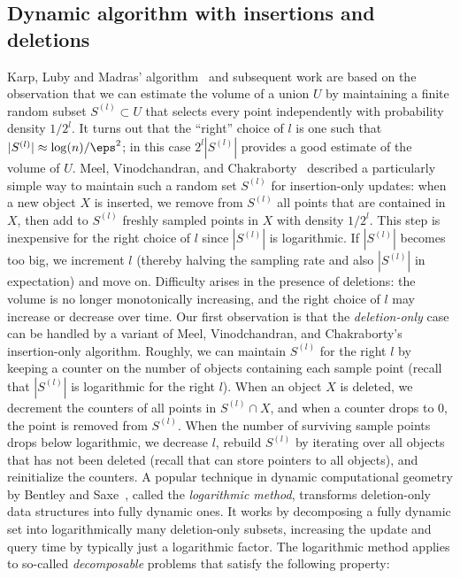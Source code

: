 \subsection{Dynamic algorithm with insertions and deletions}
Karp, Luby and Madras' algorithm~\cite{KarpLM89} and subsequent work are based on the observation that we can estimate the volume of a union $U$ by maintaining a finite random subset $S^{(l)} \subset U$ that selects every point independently with probability density $1/2^l$. It turns out that the ``right'' choice of $l$ is one such that $|S^{(l)}| \approx \log(n)/\eps^2$; in this case $2^l|S^{(l)}|$ provides a good estimate of the volume of $U$.
%
Meel, Vinodchandran, and Chakraborty~\cite{MVC21} described a particularly simple way to maintain such a random set $S^{(l)}$ for insertion-only updates: when a new object $X$ is inserted, we remove from $S^{(l)}$ all points that are contained in $X$, then add to $S^{(l)}$ freshly sampled points in $X$ with density $1/2^l$. This step is inexpensive for the right choice of $l$ since $|S^{(l)}|$ is logarithmic. If $|S^{(l)}|$ becomes too big, we increment $l$ (thereby halving the sampling rate and also $|S^{(l)}|$ in expectation) and move on.
%
Difficulty arises in the presence of deletions: the volume is no longer monotonically increasing, and the right choice of $l$ may increase or decrease over time. Our first observation is that the \emph{deletion-only} case can be handled by a variant of Meel, Vinodchandran, and Chakraborty's insertion-only algorithm. Roughly, we can maintain $S^{(l)}$ for the right $l$ by keeping a counter on the number of objects containing each sample point (recall that $|S^{(l)}|$ is logarithmic for the right $l$). When an object $X$ is deleted, we decrement the counters of all points in $S^{(l)} \cap X$, and when a counter drops to 0, the point is removed from $S^{(l)}$. When the number of surviving sample points drops below logarithmic, we decrease $l$, rebuild $S^{(l)}$ by iterating over all objects that has not been deleted (recall that can store pointers to all objects), and reinitialize the counters.
%
A popular technique in dynamic computational geometry by Bentley and Saxe~\cite{BS80}, called the \emph{logarithmic method}, transforms deletion-only data structures into fully dynamic ones. It works by decomposing a fully dynamic set into logarithmically many deletion-only subsets, increasing the update and query time by typically just a logarithmic factor. The logarithmic method applies to so-called \emph{decomposable} problems that satisfy the following property:
